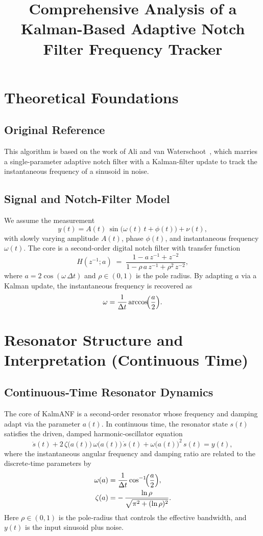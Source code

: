 \documentclass{article}
\title{Comprehensive Analysis of a Kalman-Based Adaptive Notch Filter Frequency Tracker}
\author{}
\date{}
\begin{document}
\maketitle

\section{Theoretical Foundations}

\subsection{Original Reference}
This algorithm is based on the work of  
Ali and van Waterschoot~\cite{AliWaterschoot2023}, which marries a single-parameter adaptive notch filter with a Kalman-filter update to track the instantaneous frequency of a sinusoid in noise.

\subsection{Signal and Notch-Filter Model}
We assume the measurement
\[
y(t) = A(t)\,\sin\bigl(\omega(t)\,t + \phi(t)\bigr) + \nu(t),
\]
with slowly varying amplitude \(A(t)\), phase \(\phi(t)\), and instantaneous frequency \(\omega(t)\).  The core is a second-order digital notch filter with transfer function
\[
H(z^{-1};a) \;=\; \frac{1 - a\,z^{-1} + z^{-2}}{1 - \rho\,a\,z^{-1} + \rho^2\,z^{-2}},
\]
where \(a = 2\cos(\omega\,\Delta t)\) and \(\rho\in(0,1)\) is the pole radius.  By adapting \(a\) via a Kalman update, the instantaneous frequency is recovered as
\[
\omega = \frac{1}{\Delta t}\arccos\!\Bigl(\frac{a}{2}\Bigr).
\]

\section{Resonator Structure and Interpretation (Continuous Time)}

\subsection{Continuous‐Time Resonator Dynamics}

The core of KalmANF is a second‐order resonator whose frequency and damping adapt via the parameter \(a(t)\).  In continuous time, the resonator state \(s(t)\) satisfies the driven, damped harmonic‐oscillator equation
\begin{equation}
\ddot{s}(t)
+ 2\,\zeta\bigl(a(t)\bigr)\,\omega\bigl(a(t)\bigr)\,\dot{s}(t)
+ \omega\bigl(a(t)\bigr)^2\,s(t)
= y(t),
\label{eq:resonator_ct}
\end{equation}
where the instantaneous angular frequency and damping ratio are related to the discrete‐time parameters by
\begin{align}
\omega(a)
&= \frac{1}{\Delta t}\cos^{-1}\!\Bigl(\frac{a}{2}\Bigr),
\\
\zeta(a)
&= -\,\frac{\ln\rho}{\sqrt{\pi^2 + (\ln\rho)^2}}.
\end{align}
Here \(\rho\in(0,1)\) is the pole‐radius that controls the effective bandwidth, and \(y(t)\) is the input sinusoid plus noise.
\end{document}
